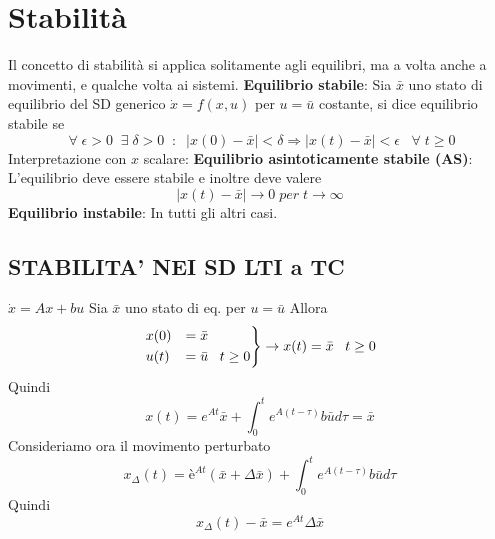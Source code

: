 \section{Stabilità}
Il concetto di stabilità si applica solitamente agli equilibri, ma a volta anche a movimenti, e qualche volta ai sistemi.\newline
\newline
\textbf{Equilibrio stabile}:\newline
Sia $\bar{x}$ uno stato di equilibrio del SD generico $\dot{x} = f(x,u)$ per $u = \bar{u}$ costante, si dice equilibrio stabile se
\[
    \;\forall\; \epsilon > 0 \;\; \exists \; \delta > 0 \;\;:\;\; |x(0) - \bar{x}| < \delta \Rightarrow  |x(t) - \bar{x}| < \epsilon \;\;\;\forall\;t \geq 0
\]
Interpretazione con $x$ scalare:\newline
\newline
\textbf{Equilibrio asintoticamente stabile (AS)}:\newline
L'equilibrio deve essere stabile e inoltre deve valere
\[
    |x(t) - \bar{x}| \rightarrow 0  \;per \; t \rightarrow \infty
\]
\newline
\textbf{Equilibrio instabile}:\newline
In tutti gli altri casi.
\subsection{STABILITA' NEI SD LTI a TC}
$\dot{x} = Ax + bu$\newline
Sia $\bar{x}$ uno stato di eq. per $u = \bar{u}$\newline
Allora
\[
    \begin{rcases}
        x(0) &= \bar{x}\\
        u(t) &= \bar{u} \;\;\; t\geq 0
    \end{rcases} \rightarrow  x(t) = \bar{x} \;\;\;t \geq 0
\]
Quindi
\[
    x(t) = e^{At} \bar{x} + \int_{0}^{t}e^{A(t-\tau)} b \bar{u} d \tau = \bar{x}
\]
Consideriamo ora il movimento perturbato 
\[
    x_{\Delta}(t) = è^{At}(\bar{x} + \Delta \bar{x}) + \int_{0}^{t}e^{A(t- \tau)}b \bar{u} d \tau
\]
Quindi 
\[
    x_\Delta (t) - \bar{x} = e^{At} \Delta \bar{x}
\]